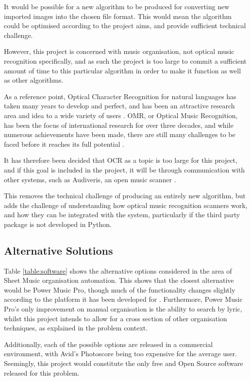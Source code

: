 It would be possible for a new algorithm to be produced for converting new imported images into the chosen file format. This would mean the algorithm  could be optimised according to the project aims, and provide sufficient technical challenge.

However, this project is concerned with music organisation, not optical music recognition specifically, and as such the project is too large to commit a sufficient amount of time to this particular algorithm in order to make it function as well as other algorithms. 

As a reference point, Optical Character Recognition for natural languages has taken many years to develop and perfect, and has been an attractive research area and idea to a wide variety of users \parencite{InternationalConf}. OMR, or Optical Music Recognition, has been the focus of international research for over three decades, and while numerous achievements have been made, there are still many challenges to be faced before it reaches its full potential \parencite{musicocr}. 

It has therefore been decided that OCR as a topic is too large for this project, and if this goal is included in the project, it will be through communication with other systems, such as Audiveris, an open music scanner \parencite{audiveris}. 

This removes the technical challenge of producing an entirely new algorithm, but adds the challenge of understanding how optical music recognition scanners work, and how they can be integrated with the system, particularly if the third party package is not developed in Python.

\subsection{Alternative Solutions}
Table \ref{table:software} shows the alternative options considered in the area of Sheet Music organisation automation. This shows that the closest alternative would be Power Music Pro, though much of the functionality changes slightly according to the platform it has been developed for \parencite{PowerMusic}. Furthermore, Power Music Pro's only improvement on manual organisation is the ability to search by lyric, whilst this project intends to allow for a cross section of other organisation techniques, as explained in the problem context.

Additionally, each of the possible options are released in a commercial environment, with Avid's Photoscore being too expensive for the average user.  Seemingly, this project would constitute the only free and Open Source software released for this problem.

